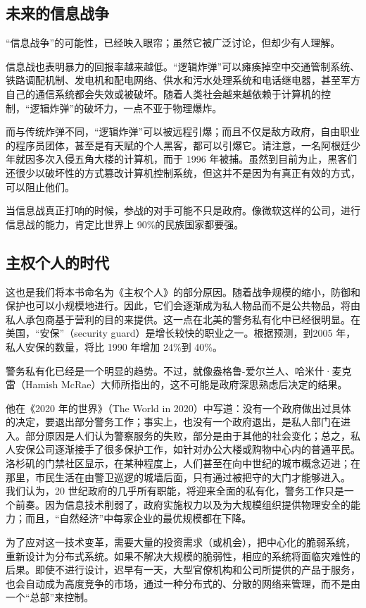 \subsection{未来的信息战争}
“信息战争”的可能性，已经映入眼帘；虽然它被广泛讨论，但却少有人理解。

信息战也表明暴力的回报率越来越低。“逻辑炸弹”可以瘫痪掉空中交通管制系统、铁路调配机制、发电机和配电网络、供水和污水处理系统和电话继电器，甚至军方自己的通信系统都会失效或被破坏。随着人类社会越来越依赖于计算机的控制，“逻辑炸弹”的破坏力，一点不亚于物理爆炸。

而与传统炸弹不同，“逻辑炸弹”可以被远程引爆；而且不仅是敌方政府，自由职业的程序员团体，甚至是有天赋的个人黑客，都可以引爆它。请注意，一名阿根廷少年就因多次入侵五角大楼的计算机，而于 1996 年被捕。虽然到目前为止，黑客们还很少以破坏性的方式篡改计算机控制系统，但这并不是因为有真正有效的方式，可以阻止他们。

当信息战真正打响的时候，参战的对手可能不只是政府。像微软这样的公司，进行信息战的能力，肯定比世界上 90\%的民族国家都要强。

\subsection{主权个人的时代}
这也是我们将本书命名为《主权个人》的部分原因。随着战争规模的缩小，防御和保护也可以小规模地进行。因此，它们会逐渐成为私人物品而不是公共物品，将由私人承包商基于营利的目的来提供。这一点在北美的警务私有化中已经很明显。在美国，“安保”（security guard）是增长较快的职业之一。根据预测，到2005 年，私人安保的数量，将比 1990 年增加 24\%到 40\%。

警务私有化已经是一个明显的趋势。不过，就像盎格鲁-爱尔兰人、哈米什·麦克雷（Hamish McRae）大师所指出的，这不可能是政府深思熟虑后决定的结果。

他在《2020 年的世界》（The World in 2020）中写道：没有一个政府做出过具体的决定，要退出部分警务工作；事实上，也没有一个政府退出，是私人部门在进入。部分原因是人们认为警察服务的失败，部分是由于其他的社会变化；总之，私人安保公司逐渐接手了很多保护工作，如针对办公大楼或购物中心内的普通平民。洛杉矶的门禁社区显示，在某种程度上，人们甚至在向中世纪的城市概念迈进；在那里，市民生活在由警卫巡逻的城墙后面，只有通过被把守的大门才能够进入。 我们认为，20 世纪政府的几乎所有职能，将迎来全面的私有化，警务工作只是一个前奏。因为信息技术削弱了，政府实施权力以及为大规模组织提供物理安全的能力；而且，“自然经济”中每家企业的最优规模都在下降。

为了应对这一技术变革，需要大量的投资需求（或机会），把中心化的脆弱系统，重新设计为分布式系统。如果不解决大规模的脆弱性，相应的系统将面临灾难性的后果。即使不进行设计，迟早有一天，大型官僚机构和公司所提供的产品于服务，也会自动成为高度竞争的市场，通过一种分布式的、分散的网络来管理，而不是由一个“总部”来控制。

